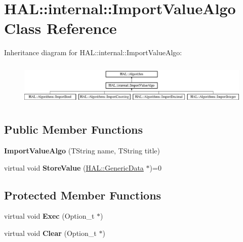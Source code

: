\hypertarget{class_h_a_l_1_1internal_1_1_import_value_algo}{\section{H\-A\-L\-:\-:internal\-:\-:Import\-Value\-Algo Class Reference}
\label{class_h_a_l_1_1internal_1_1_import_value_algo}
}
Inheritance diagram for H\-A\-L\-:\-:internal\-:\-:Import\-Value\-Algo\-:\begin{figure}[H]
\begin{center}
\leavevmode
\includegraphics[height=2.100000cm]{class_h_a_l_1_1internal_1_1_import_value_algo}
\end{center}
\end{figure}
\subsection*{Public Member Functions}
\begin{DoxyCompactItemize}
\item 
\hypertarget{class_h_a_l_1_1internal_1_1_import_value_algo_aa4ed64a83c8096e3352e08cce83617c0}{{\bfseries Import\-Value\-Algo} (T\-String name, T\-String title)}\label{class_h_a_l_1_1internal_1_1_import_value_algo_aa4ed64a83c8096e3352e08cce83617c0}

\item 
\hypertarget{class_h_a_l_1_1internal_1_1_import_value_algo_af910193fdf5af48add1134a0efa1eb41}{virtual void {\bfseries Store\-Value} (\hyperlink{class_h_a_l_1_1_generic_data}{H\-A\-L\-::\-Generic\-Data} $\ast$)=0}\label{class_h_a_l_1_1internal_1_1_import_value_algo_af910193fdf5af48add1134a0efa1eb41}

\end{DoxyCompactItemize}
\subsection*{Protected Member Functions}
\begin{DoxyCompactItemize}
\item 
\hypertarget{class_h_a_l_1_1internal_1_1_import_value_algo_a5148b57164b254f4a844c16620739501}{virtual void {\bfseries Exec} (Option\-\_\-t $\ast$)}\label{class_h_a_l_1_1internal_1_1_import_value_algo_a5148b57164b254f4a844c16620739501}

\item 
\hypertarget{class_h_a_l_1_1internal_1_1_import_value_algo_ae8d50b4898114c2c4340b1af569eea2d}{virtual void {\bfseries Clear} (Option\-\_\-t $\ast$)}\label{class_h_a_l_1_1internal_1_1_import_value_algo_ae8d50b4898114c2c4340b1af569eea2d}

\end{DoxyCompactItemize}
